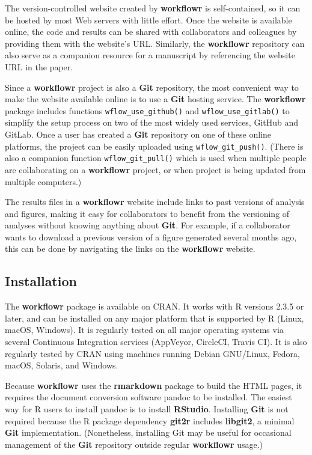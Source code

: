 \documentclass[9pt,a4paper]{extarticle}
\begin{document}
The version-controlled website created by \textbf{workflowr} is self-contained,
so it can be hosted by most Web servers with little effort. Once the
website is available online, the code and results can be shared with
collaborators and colleagues by providing them with the website's URL.
Similarly, the \textbf{workflowr} repository can also serve as a companion
resource for a manuscript by referencing the website URL in the paper.

Since a \textbf{workflowr} project is also a \textbf{Git} repository, the most convenient
way to make the website available online is to use a \textbf{Git} hosting
service. The \textbf{workflowr} package includes functions \texttt{wflow\_use\_github()} and
\texttt{wflow\_use\_gitlab()} to simplify the setup process on two of the most
widely used services, GitHub and GitLab. Once a user has created a \textbf{Git}
repository on one of these online platforms, the project can be easily
uploaded using \texttt{wflow\_git\_push()}. (There is also a companion function
\texttt{wflow\_git\_pull()} which is used when multiple people are collaborating on
a \textbf{workflowr} project, or when project is being updated from multiple
computers.)

The results files in a \textbf{workflowr} website include links to past versions
of analysis and figures, making it easy for collaborators to benefit
from the versioning of analyses without knowing anything about \textbf{Git}. For
example, if a collaborator wants to download a previous version of a
figure generated several months ago, this can be done by navigating the
links on the \textbf{workflowr} website.

\subsection*{Installation}

The \textbf{workflowr} package is available on CRAN. It works with R versions
2.3.5 or later, and can be installed on any major platform that is
supported by R (Linux, macOS, Windows). It is regularly tested on all
major operating systems via several Continuous Integration services
(AppVeyor, CircleCI, Travis CI). It is also regularly tested by CRAN
using machines running Debian GNU/Linux, Fedora, macOS, Solaris, and
Windows.

Because \textbf{workflowr} uses the \textbf{rmarkdown} package to build the HTML pages, it
requires the document conversion software pandoc to be installed. The
easiest way for R users to install pandoc is to install \textbf{RStudio}.
Installing \textbf{Git} is not required because the R package dependency \textbf{git2r}
includes \textbf{libgit2}, a minimal \textbf{Git} implementation. (Nonetheless, installing
Git may be useful for occasional management of the \textbf{Git} repository
outside regular \textbf{workflowr} usage.)
\end{document}
